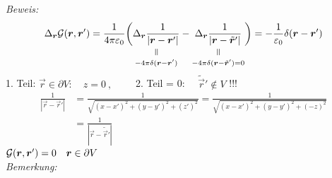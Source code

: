 \noindent
\emph{Beweis:}
\begin{equation*}
\Delta_{\vec{r}} \grr = \kq \bigg(\equalto{\Delta_{\vec{r}} \frac{1}{|\vec{r} - \vec{r}'|}}{- 4 \pi \delta(\vec{r} - \vec{r}')} - \equalto{\Delta_{\vec{r}} \frac{1}{|\vec{r} - \tilde{\vec{r}}'|}}{- 4 \pi \delta(\vec{r} - \tilde{\vec{r}}') = 0 }\bigg) = - \frac{1}{\epsilon_0} \delta(\vec{r} - \vec{r}')
\end{equation*}
1. Teil: $ \vec{r} \in \partial V : \quad z = 0 \ ,\qquad$ 2. Teil = 0: $ \quad \tilde{\vec{r}}' \notin V $ !!!
\begin{align*}
\frac{1}{|\vec{r} - \vec{r}'|} &= \frac{1}{\sqrt{(x-x')^2 + (y - y')^2 + (z')^2}} = \frac{1}{\sqrt{(x-x')^2 + (y-y')^2 + (-z)^2}}\\
&= \frac{1}{|\vec{r} - \tilde{\vec{r}}'|}
\end{align*}
$ \mathcal{G}(\bm{r},\bm{r}') = 0 \quad \bm{r} \in \partial V $\\[5pt]
\emph{Bemerkung:}
